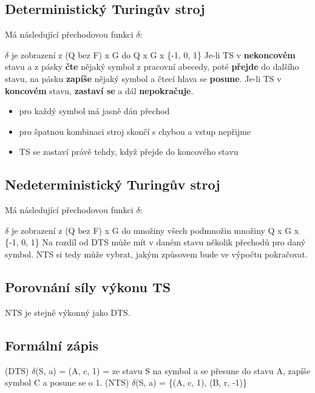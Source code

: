 \documentclass{szzclass}
\begin{document}
\subsection{Deterministický Turingův stroj}
Má následující přechodovou funkci $\delta$:

$\delta$ je zobrazení z (Q bez F) x G do Q x G x \{-1, 0, 1\}
\newline
Je-li TS v \textbf{nekoncovém} stavu a z pásky \textbf{čte} nějaký symbol z pracovní abecedy, poté \textbf{přejde} do dalšího stavu, na pásku \textbf{zapíše} nějaký symbol
a čtecí hlava se \textbf{posune}.
\newline
Je-li TS v \textbf{koncovém} stavu, \textbf{zastaví se} a dál \textbf{nepokračuje}.
\newline
\begin{itemize}
\item pro každý symbol má jasně dán přechod
\item pro špatnou kombinaci stroj skončí s chybou a vstup nepřijme
\item TS se zastaví právě tehdy, když přejde do koncového stavu
\end{itemize}

\subsection{Nedeterministický Turingův stroj}
Má následující přechodovou funkci $\delta$:

$\delta$ je zobrazení z (Q bez F) x G do množiny všech podmnožin množiny Q x G x \{-1, 0, 1\}
\newline
\newline
Na rozdíl od DTS může mít v daném stavu několik přechodů pro daný symbol.
NTS si tedy může vybrat, jakým způsovem bude ve výpočtu pokračovat.

\subsection{Porovnání síly výkonu TS}
NTS je stejně výkonný jako DTS.
\subsection{Formální zápis}
(DTS) $\delta$(S, a) = (A, c, 1) = ze stavu S na symbol a se přesune do stavu A, zapíše symbol C a posune se o 1.
\newline
(NTS) $\delta$(S, a) = \{(A, c, 1), (B, r, -1)\}
\end{document}
